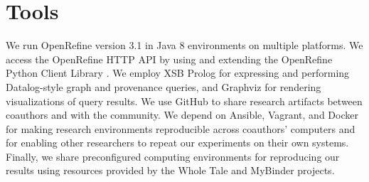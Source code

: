 \section{Tools}

We run OpenRefine version 3.1 \cite{OpenRefine} in Java 8 environments on multiple platforms. We access the OpenRefine HTTP API by using and extending the OpenRefine Python Client Library \cite{makepeace18ORclient}. 
We employ XSB Prolog \cite{xsb_software} for expressing and performing Datalog-style graph and provenance queries, and Graphviz for rendering visualizations of query results. We use GitHub to share research artifacts between coauthors and with the community. We depend on Ansible, Vagrant, and Docker for making research environments reproducible across coauthors' computers and for enabling other researchers to repeat our experiments on their own systems. Finally, we share preconfigured computing environments for reproducing our results using resources provided by the Whole Tale \cite{brinckman2019computing} and MyBinder \cite{Binder_2018} projects.

